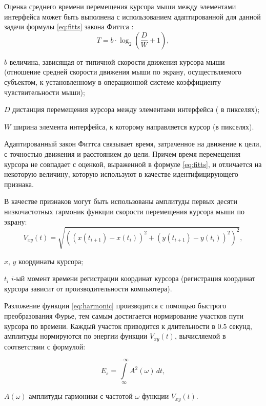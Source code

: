 Оценка среднего времени перемещения курсора мыши между элементами интерфейса может быть выполнена с использованием адаптированной для данной задачи формулы \eqref{eq:fitts} закона Фиттса \cite{fitts}:
\begin{equation}
\label{eq:fitts}
T = b \cdot \log_{2}\left(\frac{D}{W} + 1\right),
\end{equation}
\begin{eqexpl}[15mm]
\item{$b$} величина, зависящая от типичной скорости движения курсора мыши (отношение средней скорости движения мыши по экрану, осуществляемого субъектом, к установленному в операционной системе коэффициенту чувствительности мыши);
\item{$D$} дистанция перемещения курсора между элементами интерфейса ( в пикселях);
\item{$W$} ширина элемента интерфейса, к которому направляется курсор (в пикселях).
\end{eqexpl}

Адаптированный закон Фиттса связывает время, затраченное на движение к цели, с точностью движения и расстоянием до цели. Причем время перемещения курсора не совпадает с оценкой, выраженной в формуле \eqref{eq:fitts}, и отличается на некоторую величину, которую используют в качестве идентифицирующего признака. \cite{mouseMethod}

В качестве признаков могут быть использованы амплитуды первых десяти низкочастотных гармоник функции скорости перемещения курсора мыши по экрану:
\begin{equation}
\label{eq:harmonic}
V_{xy}(t) = \sqrt{((x(t_{i+1}) - x(t_i))^2 + (y(t_{i+1})-y(t_i))^2)^2},
\end{equation}
\begin{eqexpl}[15mm]
\item{$x$, $y$} координаты курсора;
\item{$t_i$} $i$-ый момент времени регистрации координат курсора (регистрация координат курсора зависит от производительности компьютера).
\end{eqexpl}

Разложение функции \eqref{eq:harmonic} производится с помощью быстрого преобразования Фурье, тем самым достигается нормирование участков пути курсора по времени. Каждый участок приводится к длительности в $0.5$ секунд, амплитуды нормируются по энергии функции $V_{xy}(t)$, вычисляемой в соответствии с формулой:

\begin{equation}
\label{eq:normir}
E_s = \int\limits_{\infty}^{-\infty} A^2(\omega)\,dt,
\end{equation}
\begin{eqexpl}[15mm]
\item{$A(\omega)$} амплитуды гармоники с частотой $\omega$ функции $V_{xy}(t)$.
\end{eqexpl}

